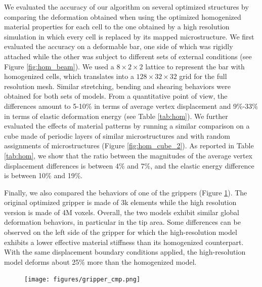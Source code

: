 We evaluated the accuracy of our algorithm on several optimized structures by comparing the deformation obtained when using the optimized homogenized material properties for each cell to the one obtained by a high resolution simulation in which every cell is replaced by its mapped microstructure.
We first evaluated the accuracy on a deformable bar, one side of which was rigidly attached while the other was subject to different sets of external conditions (see Figure \ref{fig:hom_beam}). We used a $8\times2\times2$ lattice to represent the bar with homogenized cells, which translates into a $128\times32\times32$ grid for the full resolution mesh. Similar stretching, bending and shearing behaviors were obtained for both sets of models. From a quantitative point of view, the differences amount to 5-10\% in terms of average vertex displacement and 9\%-33\% in terms of elastic deformation energy (see Table \ref{tab:hom}). We further evaluated the effects of material patterns by running a similar comparison on a cube made of periodic layers of similar microstructures and with random assignments of microstructures (Figure \ref{fig:hom_cube_2}).  As reported in Table \ref{tab:hom}, we show that the ratio between the magnitudes of the average vertex displacement differences is between 4\% and 7\%, and the elastic energy difference is between 10\% and 19\%.

Finally, we also compared the behaviors of one of the grippers (Figure \ref{fig:gripper_validate}). The original optimized gripper is made of 3k elements while the high resolution version is made of 4M voxels.
Overall, the two models exhibit similar global deformation behaviors, in particular in the tip area. Some differences can be observed on the left side of the gripper for which the high-resolution model exhibits a lower effective material stiffness than its homogenized counterpart. With the same displacement boundary conditions applied, the high-resolution model deforms about 25\% more than the homogenized model.
	
	\begin{figure}[t]
		\centering
		\texttt{[image: figures/gripper\_cmp.png]}	
		\caption{
			\label{fig:gripper_validate}}
	\end{figure}
	
